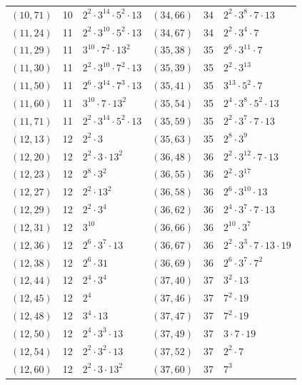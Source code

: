 \documentclass[11pt]{article}
\begin{document}
\begin{longtable}{@{}lrl@{\qquad}lrl@{}}
$(10,71)$ & 10 & $2^{2}\cdot 3^{14}\cdot 5^{2}\cdot 13$ & $(34,66)$ & 34 & $2^{2}\cdot 3^{8}\cdot 7\cdot 13$\\
$(11,24)$ & 11 & $2^{2}\cdot 3^{10}\cdot 5^{2}\cdot 13$ & $(34,67)$ & 34 & $2^{2}\cdot 3^{4}\cdot 7$\\
$(11,29)$ & 11 & $3^{10}\cdot 7^{2}\cdot 13^{2}$ & $(35,38)$ & 35 & $2^{6}\cdot 3^{11}\cdot 7$\\
$(11,30)$ & 11 & $2^{2}\cdot 3^{10}\cdot 7^{2}\cdot 13$ & $(35,39)$ & 35 & $2^{2}\cdot 3^{13}$\\
$(11,50)$ & 11 & $2^{6}\cdot 3^{14}\cdot 7^{3}\cdot 13$ & $(35,41)$ & 35 & $3^{13}\cdot 5^{2}\cdot 7$\\
$(11,60)$ & 11 & $3^{10}\cdot 7\cdot 13^{2}$ & $(35,54)$ & 35 & $2^{4}\cdot 3^{8}\cdot 5^{2}\cdot 13$\\
$(11,71)$ & 11 & $2^{2}\cdot 3^{14}\cdot 5^{2}\cdot 13$ & $(35,59)$ & 35 & $2^{2}\cdot 3^{7}\cdot 7\cdot 13$\\
$(12,13)$ & 12 & $2^{2}\cdot 3$ & $(35,63)$ & 35 & $2^{8}\cdot 3^{9}$\\
$(12,20)$ & 12 & $2^{2}\cdot 3\cdot 13^{2}$ & $(36,48)$ & 36 & $2^{2}\cdot 3^{12}\cdot 7\cdot 13$\\
$(12,23)$ & 12 & $2^{8}\cdot 3^{2}$ & $(36,55)$ & 36 & $2^{2}\cdot 3^{17}$\\
$(12,27)$ & 12 & $2^{2}\cdot 13^{2}$ & $(36,58)$ & 36 & $2^{6}\cdot 3^{10}\cdot 13$\\
$(12,29)$ & 12 & $2^{2}\cdot 3^{4}$ & $(36,62)$ & 36 & $2^{4}\cdot 3^{7}\cdot 7\cdot 13$\\
$(12,31)$ & 12 & $3^{10}$ & $(36,66)$ & 36 & $2^{10}\cdot 3^{7}$\\
$(12,36)$ & 12 & $2^{6}\cdot 3^{7}\cdot 13$ & $(36,67)$ & 36 & $2^{2}\cdot 3^{3}\cdot 7\cdot 13\cdot 19$\\
$(12,38)$ & 12 & $2^{6}\cdot 31$ & $(36,69)$ & 36 & $2^{6}\cdot 3^{7}\cdot 7^{2}$\\
$(12,44)$ & 12 & $2^{4}\cdot 3^{4}$ & $(37,40)$ & 37 & $3^{2}\cdot 13$\\
$(12,45)$ & 12 & $2^{4}$ & $(37,46)$ & 37 & $7^{2}\cdot 19$\\
$(12,48)$ & 12 & $3^{4}\cdot 13$ & $(37,47)$ & 37 & $7^{2}\cdot 19$\\
$(12,50)$ & 12 & $2^{4}\cdot 3^{3}\cdot 13$ & $(37,49)$ & 37 & $3\cdot 7\cdot 19$\\
$(12,54)$ & 12 & $2^{2}\cdot 3^{2}\cdot 13$ & $(37,52)$ & 37 & $2^{2}\cdot 7$\\
$(12,60)$ & 12 & $2^{2}\cdot 3\cdot 13^{2}$ & $(37,60)$ & 37 & $7^{3}$\\

\end{longtable}
\end{document}
